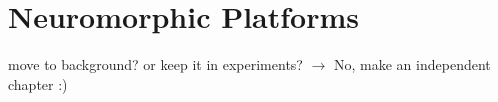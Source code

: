 \chapter{Neuromorphic Platforms}
move to background? or keep it in experiments? $\rightarrow$ No, make an independent chapter :)